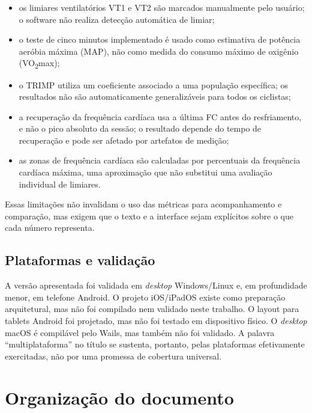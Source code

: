 \begin{itemize}
    \item os limiares ventilatórios VT1 e VT2 são marcados manualmente pelo
        usuário; o software não realiza detecção automática de limiar;
    \item o teste de cinco minutos implementado é usado como estimativa de
        potência aeróbia máxima (MAP), não como medida do consumo máximo de
        oxigênio (VO\textsubscript{2}max);
    \item o TRIMP utiliza um coeficiente associado a uma população específica;
        os resultados não são automaticamente generalizáveis para todos os
        ciclistas;
    \item a recuperação da frequência cardíaca usa a última FC antes do
        resfriamento, e não o pico absoluto da sessão; o resultado depende do
        tempo de recuperação e pode ser afetado por artefatos de medição;
    \item as zonas de frequência cardíaca são calculadas por percentuais da
        frequência cardíaca máxima, uma aproximação que não substitui uma
        avaliação individual de limiares.
\end{itemize}

Essas limitações não invalidam o uso das métricas para acompanhamento e
comparação, mas exigem que o texto e a interface sejam explícitos sobre o que
cada número representa.

\subsection{Plataformas e validação}
\label{sec:plataformas-delimitacoes}

A versão apresentada foi validada em \textit{desktop} Windows/Linux e, em
profundidade menor, em telefone Android. O projeto iOS/iPadOS existe como
preparação arquitetural, mas não foi compilado nem validado neste trabalho. O
layout para tablets Android foi projetado, mas não foi testado em dispositivo
físico. O \textit{desktop} macOS é compilável pelo Wails, mas também não foi
validado. A palavra ``multiplataforma'' no título se sustenta, portanto, pelas
plataformas efetivamente exercitadas, não por uma promessa de cobertura
universal.

\section{Organização do documento}
\label{sec:organizacao}

